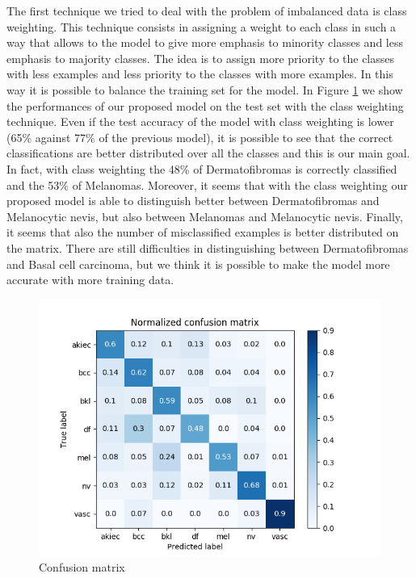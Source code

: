 		The first technique we tried to deal with the problem of imbalanced data is class weighting. This technique consists in assigning a weight to each class in such a way that allows to the model to give more emphasis to minority classes and less emphasis to majority classes. The idea is to assign more priority to the classes with less examples and less priority to the classes with more examples. In this way it is possible to balance the training set for the model. 
		In Figure \ref{fig:second-matrix} we show the performances of our proposed model on the test set with the class weighting technique.
		Even if the test accuracy of the model with class weighting is lower (65\% against 77\% of the previous model), it is possible to see that the correct classifications are better distributed over all the classes and this is our main goal. In fact, with class weighting the 48\% of Dermatofibromas is correctly classified and the 53\% of Melanomas. Moreover, it seems that with the class weighting our proposed model is able to distinguish better between Dermatofibromas and Melanocytic nevis, but also between Melanomas and Melanocytic nevis. Finally, it seems that also the number of misclassified examples is better distributed on the matrix. There are still difficulties in distinguishing between Dermatofibromas and Basal cell carcinoma, but we think it is possible to make the model more accurate with more training data.
		
		\begin{figure}[H]
			\centering
			\includegraphics[width=15cm]{images/secondMatrix.png}
			\caption{Confusion matrix}
			\label{fig:second-matrix}
		\end{figure}
		
